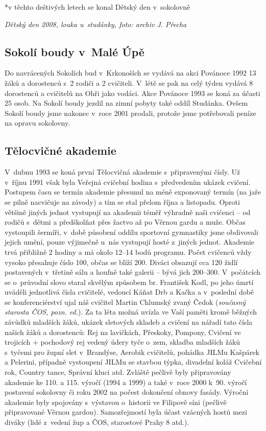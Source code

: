 \documentclass[a5paper, 12pt, twoside]{article}
\begin{document}
*v těchto deštivých letech se konal Dětský den v~sokolovně


\textit{Dětský den 2008, louka u~studánky, foto: archiv J. Přecha}

\subsection{Sokolí boudy v~Malé Úpě}

Do navrácených Sokolích bud v~Krkonoších se vydává na akci Povánoce 1992
13 žáků a dorostenců s~2 rodiči a 2 cvičiteli. V~létě se pak na celý
týden vydává 8 dorostenců a cvičitelů na Ohři jako vodáci. Akce Povánoce
1993 se koná za účasti 25 osob. Na Sokolí boudy jezdil na zimní pobyty
také oddíl Studánka. Ovšem Sokolí boudy jsme nakonec v~roce 2001
prodali, protože jsme potřebovali peníze na opravu sokolovny.

\subsection{Tělocvičné akademie}

V~dubnu 1993 se koná první Tělocvičná akademie s~připravenými čísly. Už
v~říjnu 1991 však byla Veřejná cvičební hodina s~předvedením ukázek
cvičení. Postupem času se termín akademie přesunul na méně exponovaný
termín (na jaře se pilně nacvičuje na závody) a tím se stal přelom října
a listopadu. Oproti většině jiných jednot vystupují na akademii téměř
výhradně naši cvičenci -- od rodičů s~dětmi a předškolňat přes žactvo až
po Věrnou gardu a muže. Občas vystoupili šermíři, v~době působení oddílu
sportovní gymnastiky jsme obdivovali jejich umění, pouze výjimečně u~nás
vystupují hosté z~jiných jednot. Akademie trvá přibližně 2 hodiny a má
okolo 12--14 bodů programu. Počet cvičenců vždy vysoko přesahuje číslo
100, občas se blíží 200. Diváci obsazují cca 120 židlí postavených
v~třetině sálu a houfně také galerii -- bývá jich 200--300. V~počátcích se
o~průvodní slovo staral skvělým způsobem br. František Kodl, po jeho
úmrtí uváděli jednotlivá čísla cvičitelé, vedoucí Káňat Drb a Kačka a
v~poslední době se konferenciérství ujal náš cvičitel Martin Chlumský
zvaný Čedok (\textit{současný starosta ČOS, pozn. ed.}). Za ta léta možná
uvízla ve Vaší paměti kromě běžných závůdků mladších žáků, ukázek
sletových skladeb a cvičení na nářadí tato čísla našich žáků a
dorostenců: Rej na lavičkách, Přeskoky, Pompony, Cvičení ve trojicích +
pochodový rej vedený údery tyče o~zem, skladba mladších žáků s~tyčemi
pro župní slet v~Brandýse, Aerobik cvičitelů, pohádka JILMu Kašpárek a
Pelerini, případně vystoupení JILMu se stavbou týpka, divadelní koláž
Cvičební rok, Country tance, Správní kluci atd. Zvláště pečlivě byly
připravovány akademie ke 110. a 115. výročí (1994 a 1999) a také v~roce
2000 k~90. výročí postavení sokolovny či roku 2002 na počest dokončení
obnovy fasády. Výroční akademie byly spojovány s~výstavou o~historii ve
Filipově síni (pečlivě připravované Věrnou gardou). Samozřejmostí byla
účast vzácných hostů mezi diváky (lidé z~vedení žup a ČOS, starostové
Prahy 8 atd.).
\end{document}
